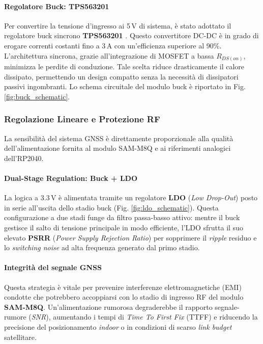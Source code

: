 \paragraph{Regolatore Buck: TPS563201}
Per convertire la tensione d'ingresso ai 5\,V di sistema, è stato adottato il regolatore buck sincrono \textbf{TPS563201} \cite{tps563201_ds}. Questo convertitore DC-DC è in grado di erogare correnti costanti fino a 3\,A con un'efficienza superiore al 90\%. L'architettura sincrona, grazie all'integrazione di MOSFET a bassa $R_{DS(on)}$, minimizza le perdite di conduzione. Tale scelta riduce drasticamente il calore dissipato, permettendo un design compatto senza la necessità di dissipatori passivi ingombranti. Lo schema circuitale del modulo buck è riportato in Fig. \ref{fig:buck_schematic}.

\subsubsection*{Regolazione Lineare e Protezione RF}

La sensibilità del sistema GNSS è direttamente proporzionale alla qualità dell'alimentazione fornita al modulo SAM-M8Q e ai riferimenti analogici dell'RP2040.

\paragraph{Dual-Stage Regulation: Buck + LDO}
La logica a 3.3\,V è alimentata tramite un regolatore \textbf{LDO} (\textit{Low Drop-Out}) posto in serie all'uscita dello stadio buck (Fig. \ref{fig:ldo_schematic}). Questa configurazione a due stadi funge da filtro passa-basso attivo: mentre il buck gestisce il salto di tensione principale in modo efficiente, l'LDO sfrutta il suo elevato \textbf{PSRR} (\textit{Power Supply Rejection Ratio}) per sopprimere il \textit{ripple} residuo e lo \textit{switching noise} ad alta frequenza generato dal primo stadio.

\paragraph{Integrità del segnale GNSS}
Questa strategia è vitale per prevenire interferenze elettromagnetiche (EMI) condotte che potrebbero accoppiarsi con lo stadio di ingresso RF del modulo \textbf{SAM-M8Q}. Un'alimentazione rumorosa degraderebbe il rapporto segnale-rumore (\textit{SNR}), aumentando i tempi di \textit{Time To First Fix} (TTFF) e riducendo la precisione del posizionamento \textit{indoor} o in condizioni di scarso \textit{link budget} satellitare.

